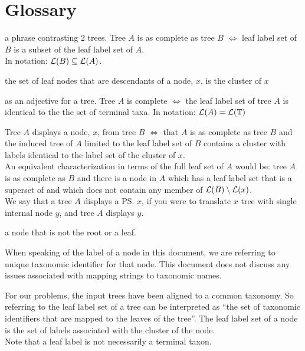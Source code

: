 \newcommand{\defitem}[2]{\item[{\bf #1}]\label{itm:#2} }
\newcommand{\notitem}[1]{\item[]#1}
\section{Glossary}
\begin{compactenum}
\defitem{as complete}{defAsComplete} a phrase contrasting 2 trees.
    Tree $A$ is as complete as tree $B$ $\iff$
    leaf label set of $B$ is a subset of the leaf label set of $A$.\\
    In notation: $\mathcal{L}(B) \subseteq \mathcal{L}(A)$.
\defitem{cluster}{defCluster} the set of leaf nodes that are descendants
    of a node, $x$, is the cluster of $x$
\defitem{complete}{defComplete} as an adjective for a tree. Tree $A$ is complete $\iff$ the leaf label set
    of tree $A$ is identical to the the set of terminal taxa.
    In notation: $\mathcal{L}(A) = \mathcal{L}(\mathbb{T})$
\defitem{display}{defDisplay} Tree $A$ displays a node, $x$, from tree $B$ $\iff$
    that $A$ is as complete as tree $B$ and the induced tree of $A$ limited to the 
    leaf label set of $B$ contains a cluster with labels identical to the label set of the cluster of $x$.\\
    An equivalent characterization in terms of the full leaf set of $A$ would be:
    tree $A$ is as complete as $B$ and there is a node in $A$ which has a leaf label set 
    that is a superset of  and which does not contain any member of $\mathcal{L}(B) \setminus \mathcal{L}(x)$.\\
    We say that a tree $A$ displays a \ps $x$, if you were to translate
        $x$ tree with single internal node $y$, and tree $A$ displays $y$.
\defitem{internal node}{defInternalNode} a node that is not the root or a leaf.
\defitem{label}{defLabel} When speaking of the label of a node in this document, we are referring to unique taxonomic
    identifier for that node.
    This document does not discuss any issues associated with mapping strings to taxonomic names.
\defitem{leaf labels}{defLeafLabels} For our problems, the input trees have been aligned to a common
    taxonomy. 
    So referring to the leaf label set of a tree can be interpreted as
    ``the set of taxonomic identifiers that are mapped to the leaves of the tree''.
    The leaf label set of a node is the set of labels associated with the cluster of the node.\\
    Note that a leaf label is not necessarily a terminal taxon.

\end{compactenum}
